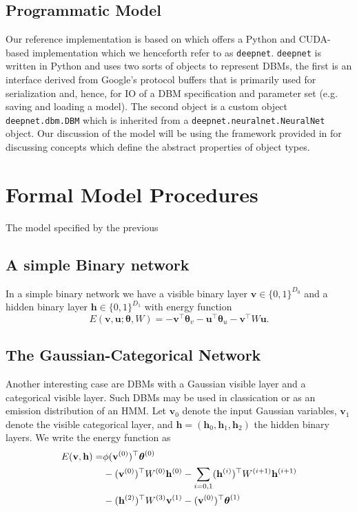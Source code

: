 \documentclass{article} %
\begin{document}
\subsection{Programmatic Model}

Our reference implementation is based on \cite{srivastava2014deepnet} which offers a Python and CUDA-based implementation which we
henceforth refer to as \texttt{deepnet}. \texttt{deepnet} is written in Python and uses two sorts of objects to represent DBMs, the first is
an interface derived from Google's protocol buffers that is primarily used for serialization and, hence, for IO of a DBM specification 
and parameter set (e.g. saving and loading a model).  The second object is a custom object \texttt{deepnet.dbm.DBM} which is
inherited from a \texttt{deepnet.neuralnet.NeuralNet} object. Our discussion of the model will be using the framework provided in
\cite{stepanov2009elements} for discussing concepts which define the abstract properties of object types. 



\section{Formal Model Procedures}

The model specified by the previous




\subsection{A simple Binary network}

In a simple binary network we have a visible binary layer $\mathbf{v}\in\{0,1\}^{D_0}$ and a hidden binary layer
$\mathbf{h}\in\{0,1\}^{D_1}$ with energy function
\begin{equation}
E(\mathbf{v},\mathbf{u};\boldsymbol{\theta},W) = -\mathbf{v}^\top \boldsymbol{\theta}_v - \mathbf{u}^\top \boldsymbol{\theta}_u - \mathbf{v}^\top W \mathbf{u}.
\end{equation}

\subsection{The Gaussian-Categorical Network}

Another interesting case are DBMs with a Gaussian visible layer and a categorical visible layer.  Such DBMs may be used in classication or as an emission distribution of an HMM. Let $\mathbf{v}_0$ denote the input Gaussian variables, $\mathbf{v}_1$ denote the visible categorical
layer, and $\mathbf{h}=(\mathbf{h}_0,\mathbf{h}_1,\mathbf{h}_2)$ the hidden binary layers.  We write the energy function as
\begin{align}
E(\mathbf{v},\mathbf{h}) =& \phi(\mathbf{v}^{(0)})^\top\boldsymbol{\theta}^{(0)} \notag\\
& - (\mathbf{v}^{(0)})^\top W^{(0)} \mathbf{h}^{(0)} - \sum_{i=0,1} (\mathbf{h}^{(i)})^\top W^{(i+1)} \mathbf{h}^{(i+1)}\notag\\
& - (\mathbf{h}^{(2)})^\top W^{(3)} \mathbf{v}^{(1)} - (\mathbf{v}^{(0)})^\top \boldsymbol{\theta}^{(1)}
\end{align}
\end{document}

